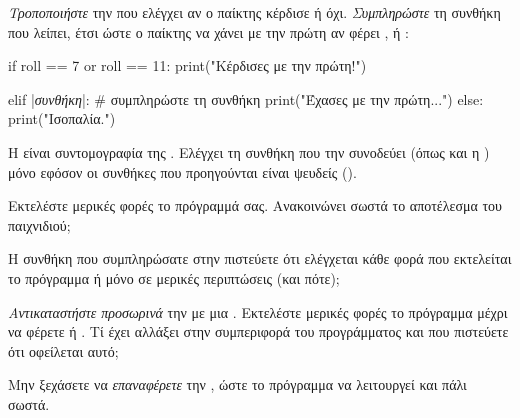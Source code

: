 \documentclass[a4paper,11pt,oneside]{book}
\begin{document}
\begin{step}
\emph{Τροποποιήστε} την  που ελέγχει αν ο παίκτης κέρδισε ή όχι. \emph{Συμπληρώστε} τη συνθήκη που λείπει, έτσι ώστε ο παίκτης να χάνει με την πρώτη αν φέρει ,  ή :

\begin{pyplain}
if roll == 7 or roll == 11:
    print("Κέρδισες με την πρώτη!")
\end{pyplain}
\begin{pynew}
elif |\textrm{\textit{συνθήκη}}|:   # συμπληρώστε τη συνθήκη
    print("Έχασες με την πρώτη...")
else:
    print("Ισοπαλία.")
\end{pynew}

Η  είναι συντομογραφία της . Ελέγχει τη συνθήκη που την συνοδεύει (όπως και η ) μόνο εφόσον οι συνθήκες που προηγούνται είναι ψευδείς ().

Εκτελέστε μερικές φορές το πρόγραμμά σας. Ανακοινώνει σωστά το αποτέλεσμα του παιχνιδιού;

\marginnote[14pt]{\icondiscuss}
\dottedline

Η συνθήκη που συμπληρώσατε στην  πιστεύετε ότι ελέγχεται κάθε φορά που εκτελείται το πρόγραμμα ή μόνο σε μερικές περιπτώσεις (και πότε);

\marginnote[14pt]{\icondiscuss}
\dottedline

\dottedline

\emph{Αντικαταστήστε προσωρινά} την  με μια . Εκτελέστε μερικές φορές το πρόγραμμα μέχρι να φέρετε  ή .
Τί έχει αλλάξει στην συμπεριφορά του προγράμματος και που πιστεύετε ότι οφείλεται αυτό;

\marginnote[14pt]{\icondiscuss}
\dottedline

\dottedline

\marginnote[18pt]{\iconcaution}
Μην ξεχάσετε να \emph{επαναφέρετε} την , ώστε το πρόγραμμα να λειτουργεί και πάλι σωστά.






\end{step}
\end{document}
